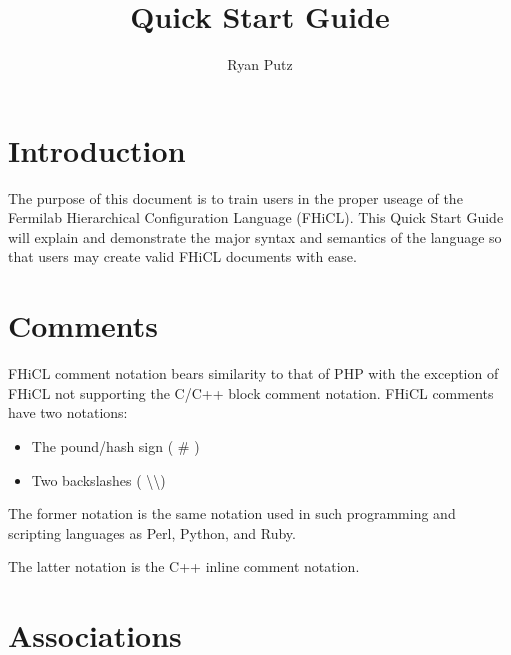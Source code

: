 \documentclass{article}
\begin{document}
\setlength{\parindent}{0in}
\title{Quick Start Guide}
\author{Ryan Putz}
\maketitle
\newpage

\tableofcontents
\newpage

\section{Introduction}
	The purpose of this document is to train users in the proper useage
	of the Fermilab Hierarchical Configuration Language (FHiCL).
	This Quick Start Guide will explain and demonstrate the major syntax and semantics
	of the language so that users may create valid FHiCL documents with ease.
\section{Comments}
	FHiCL comment notation bears similarity to that of PHP
	with the exception of FHiCL not supporting the C/C++ block comment notation.
	FHiCL comments have two notations:
	\begin{itemize}
		\item The pound/hash sign ( \# )
		\item Two backslashes ( \textbackslash\textbackslash )
	\end{itemize}
	\par
	The former notation is the same notation used in such programming and scripting languages as
	Perl, Python, and Ruby.
	\par
	The latter notation is the C++ inline comment notation.
	\par
\section{Associations}
\end{document}
